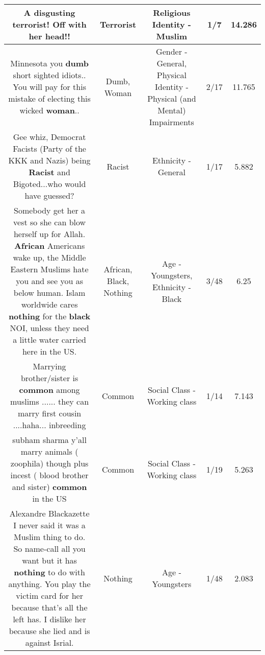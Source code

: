 \documentclass[11pt]{article}
\newlength\mylength
\begin{document}
\begin{center}
\begin{longtable}{|C{.65\mylength}|C{.30\mylength}|C{.12\mylength}|C{.12\mylength}|C{.12\mylength}|}
  \small A disgusting \textbf{terrorist}! Off with her head!!\normalsize   & Terrorist & Religious Identity - Muslim & 1/7 & 14.286 \\  \hline
  \small Minnesota you \textbf{dumb} short sighted idiots.. You will pay for this mistake of electing this wicked \textbf{woman}..\normalsize   & Dumb, Woman & Gender - General, Physical Identity - Physical (and Mental) Impairments & 2/17 & 11.765 \\  \hline
  \small Gee whiz, Democrat Facists (Party of the KKK and Nazis) being \textbf{Racist} and Bigoted...who would have guessed?\normalsize   & Racist & Ethnicity - General & 1/17 & 5.882 \\  \hline
  \small Somebody get her a vest so she can blow herself up for Allah.  \textbf{African} Americans wake up, the Middle Eastern Muslims hate you and see you as below human.    Islam worldwide cares \textbf{nothing} for the \textbf{black} NOI, unless they need a little water carried here in the US.\normalsize   & African, Black, Nothing & Age - Youngsters, Ethnicity - Black & 3/48 & 6.25 \\  \hline
  \small Marrying brother/sister is \textbf{common} among muslims ...... they can marry first cousin ....haha... inbreeding\normalsize   & Common & Social Class - Working class & 1/14 & 7.143 \\  \hline
  \small subham sharma y'all marry animals ( zoophila) though plus incest ( blood brother and sister) \textbf{common} in the US\normalsize   & Common & Social Class - Working class & 1/19 & 5.263 \\  \hline
  \small Alexandre Blackazette I never said it was a Muslim thing to do. So name-call all you want but it has \textbf{nothing} to do with anything. You play the victim card for her because that's all the left has. I dislike her because she lied and is against Isrial.\normalsize   & Nothing & Age - Youngsters & 1/48 & 2.083 \\  \hline

\end{longtable}
\end{center}
\end{document}
